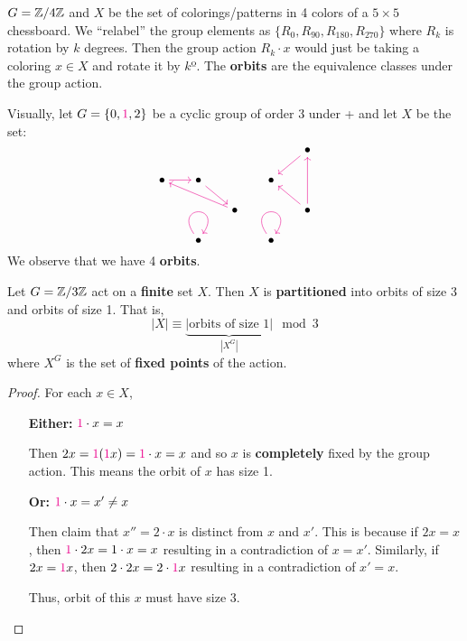 \documentclass[12pt]{article}
\begin{document}
\eg $G=\mathbb{Z\text{/4}Z}$ and $X$ be the set of colorings/patterns in 4 colors of a $5\times 5$ chessboard. We ``relabel'' the group elements as $\{R_0, R_{90}, R_{180}, R_{270}\}$ where $R_k$ is rotation by $k$ degrees. Then the group action $R_k\cdot x$ would just be taking a coloring $x\in X$ and rotate it by $k$º. The \textbf{orbits} are the equivalence classes under the group action.

\eg Visually, let $G=\{0,\textcolor{magenta}{1},2\}$ be a cyclic group of order 3 under + and let $X$ be the set: 
\[\begin{tikzcd}[ampersand replacement=\&,cramped,sep=scriptsize]
	\&\&\&\& \bullet \\
	\bullet \& \bullet \&\& \bullet \\
	\&\& \bullet \&\& \bullet \\
	\& \bullet \&\& \bullet
	\arrow[color=magenta, from=1-5, to=2-4]
	\arrow[color=magenta, from=2-1, to=2-2]
	\arrow[color=magenta, from=2-2, to=3-3]
	\arrow[color=magenta, from=3-3, to=2-1]
	\arrow[color=magenta, from=3-5, to=1-5]
	\arrow[color=magenta, from=3-5, to=2-4]
	\arrow[color=magenta, from=4-2, to=4-2, loop, in=55, out=125, distance=10mm]
	\arrow[color=magenta, from=4-4, to=4-4, loop, in=55, out=125, distance=10mm]
\end{tikzcd}\]
We observe that we have 4 \textbf{orbits}.

\begin{theorem}
    Let $G=\mathbb{Z\text{/3}Z}$ act on a \textbf{finite} set $X$. Then $X$ is \textbf{partitioned} into orbits of size 3 and orbits of size 1. That is, \[|X|\equiv \underbrace{|\text{orbits of size 1}|}_{|X^G|} \mod 3\]
    where $X^G$ is the set of \textbf{fixed points} of the action.
\end{theorem}
\begin{proof}
    For each $x\in X$, \begin{itemize}[align=left]
        \item[\textbf{Either:}] $\textcolor{magenta}{1}\cdot x=x$
        
        Then $2x = \textcolor{magenta}{1}(\textcolor{magenta}{1}x) = \textcolor{magenta}{1}\cdot x = x$ and so $x$ is \textbf{completely} fixed by the group action. This means the orbit of $x$ has size 1.

        \item[\textbf{Or:}]  $\textcolor{magenta}{1}\cdot x = x'\neq x$
        
        Then claim that $x'' = 2\cdot x $ is distinct from $x$ and $x'$. This is because if $2x=x$, then $\textcolor{magenta}{1}\cdot 2x = 1\cdot x = x$ resulting in a contradiction of $x=x'$. Similarly, if $2x = \textcolor{magenta}{1}x$, then $2\cdot 2x = 2\cdot \textcolor{magenta}{1}x$  resulting in a contradiction of $x'=x$. 

        Thus, orbit of this $x$ must have size 3.
    \end{itemize}
\end{proof}
\end{document}
